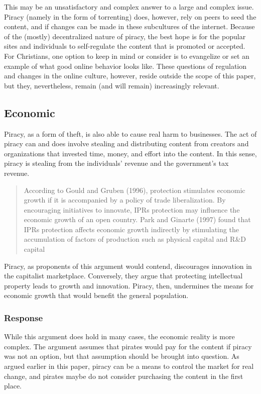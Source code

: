 \documentclass[onecolumn, 12pt]{article}
\begin{document}
\begin{refsection}
This may be an unsatisfactory and complex answer to a large and complex issue.
Piracy (namely in the form of torrenting) does, however, rely on peers to
seed the content, and if changes can be made in these subcultures of the
internet. Because of the (mostly) decentralized nature of piracy, the best hope
is for the popular sites and individuals to self-regulate the content that is
promoted or accepted. For Christians, one option to keep in mind or consider
is to evangelize or set an example of what good online behavior looks like.
These questions of regulation and changes in the online culture, however,
reside outside the scope of this paper, but they, nevertheless, remain (and
will remain) increasingly relevant.

\subsection{Economic}
Piracy, as a form of theft, is also able to cause real harm to businesses. The
act of piracy can and does involve stealing and distributing content from
creators and organizations that invested time, money, and effort into the
content. In this sense, piracy is stealing from the individuals' revenue and
the government's tax revenue.~\cite{congress:pirating-the-american-dream}

\blockcquote{mrad:effects-of-ip}[.]{%
  According to Gould and Gruben (1996),
   protection stimulates economic
  growth if it is accompanied by a policy of trade liberalization. By
  encouraging initiatives to innovate, IPRs protection may influence the
  economic growth of an open country. Park and Ginarte (1997) found that IPRs
  protection affects economic growth indirectly by stimulating the accumulation
  of factors of production such as physical capital and R\&D capital%
}
Piracy, as proponents of this argument would contend, discourages innovation in
the capitalist marketplace. Conversely, they argue that protecting intellectual
property leads to growth and innovation. Piracy, then, undermines the means for
economic growth that would benefit the general population.

\subsubsection{Response}
While this argument does hold in many cases, the economic reality is more
complex. The argument assumes that pirates would pay for the content if piracy
was not an option, but that assumption should be brought into question. As
argued earlier in this paper, piracy can be a means to control the market for
real change, and pirates maybe do not consider purchasing the content in the
first place.


\end{refsection}
\end{document}
